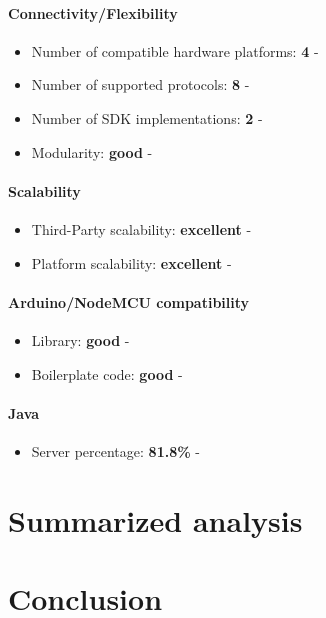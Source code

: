 \documentclass{article}
\begin{document}
\paragraph{Connectivity/Flexibility}

\begin{itemize}
\item Number of compatible hardware platforms: \textbf{4} - 
\item Number of supported protocols: \textbf{8} - 
\item Number of SDK implementations: \textbf{2} - 
\item Modularity: \textbf{good} - 
\end{itemize}

\paragraph{Scalability}

\begin{itemize}
\item Third-Party scalability: \textbf{excellent} - 
\item Platform scalability: \textbf{excellent} - 
\end{itemize}

\paragraph{Arduino/NodeMCU compatibility}

\begin{itemize}
\item Library: \textbf{good} - 
\item Boilerplate code: \textbf{good} - 
\end{itemize}

\paragraph{Java} 

\begin{itemize}
\item Server percentage: \textbf{81.8\%} - 
\end{itemize}

\newpage

\section{Summarized analysis}

\newpage

\section*{Conclusion}
%
\end{document}
